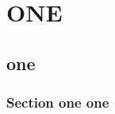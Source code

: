 \documentclass{book}
\begin{document}
\tableofcontents

\part{ONE}

\chapter{one}

\localtableofcontents

\section{Section one one}
\end{document}
